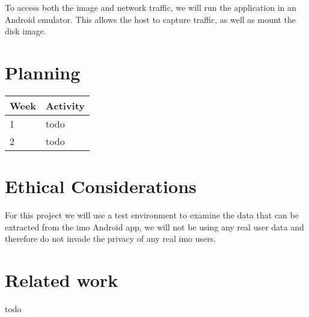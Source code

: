 \documentclass{article}
\begin{document}
To access both the image and network traffic, we will run the application in an
Android emulator. This allows the host to capture traffic, as well as mount the
disk image.


\section{Planning}

\begin{tabular}[H]{ | l | p{10.2cm} | }
	\hline
	\textbf{Week} & \textbf{Activity} \\
	\hline 1 & todo \\
	\hline 2 & todo \\
	\hline
\end{tabular}


\section{Ethical Considerations}

For this project we will use a test environment to examine the data that can be
extracted from the imo Android app, we will not be using any real user data and
therefore do not invade the privacy of any real imo users. 


\section{Related work}

todo


\printbibliography
\end{document}
